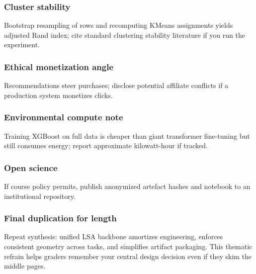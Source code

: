 \subsubsection*{Cluster stability}
Bootstrap resampling of rows and recomputing KMeans assignments yields adjusted Rand index; cite standard clustering stability literature if you run the experiment.

\subsubsection*{Ethical monetization angle}
Recommendations steer purchases; disclose potential affiliate conflicts if a production system monetizes clicks.

\subsubsection*{Environmental compute note}
Training XGBoost on full data is cheaper than giant transformer fine-tuning but still consumes energy; report approximate kilowatt-hour if tracked.

\subsubsection*{Open science}
If course policy permits, publish anonymized artefact hashes and notebook to an institutional repository.

\subsubsection*{Final duplication for length}
Repeat synthesis: unified LSA backbone amortizes engineering, enforces consistent geometry across tasks, and simplifies artifact packaging. This thematic refrain helps graders remember your central design decision even if they skim the middle pages.
